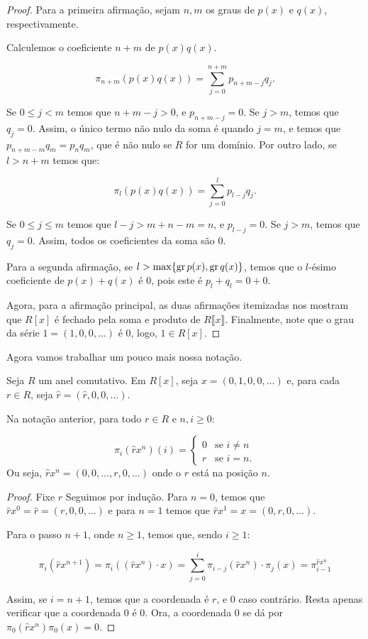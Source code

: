 \begin{proof}
    Para a primeira afirmação, sejam $n, m$ os graus de $p(x)$ e $q(x)$, respectivamente.
    
    Calculemos o coeficiente $n+m$ de $p(x)q(x)$. 

    $$\pi_{n+m}(p(x)q(x))=\sum_{j=0}^{n+m}p_{n+m-j}q_j.$$

    Se $0\leq j< m$ temos que $n+m-j>0$, e $p_{n+m-j}=0$. Se $j>m$, temos que $q_j=0$. Assim, o único termo não nulo da soma é quando $j=m$, e temos que $p_{n+m-m}q_m=p_nq_m$, que é não nulo se $R$ for um domínio. Por outro lado, se $l>n+m$ temos que:

    $$\pi_{l}(p(x)q(x))=\sum_{j=0}^{l}p_{l-j}q_j.$$

    Se $0\leq j\leq m$ temos que $l-j>m+n-m=n$, e $p_{l-j}=0$. Se $j>m$, temos que $q_j=0$. Assim, todos os coeficientes da soma são $0$.


    Para a segunda afirmação, se $l>\max\{\operatorname{gr} p(x), \operatorname{gr} q(x)\}$, temos que o $l$-ésimo coeficiente de $p(x)+q(x)$ é $0$, pois este é $p_l+q_l=0+0$.

    Agora, para a afirmação principal, as duas afirmações itemizadas nos mostram que $R[x]$ é fechado pela soma e produto de $R\llbracket x \rrbracket$. Finalmente, note que o grau da série $1=(1, 0, 0, \dots)$ é $0$, logo, $1\in R[x]$.
\end{proof}

Agora vamos trabalhar um pouco mais nossa notação.

\begin{definition}
    Seja $R$ um anel comutativo. Em $R[x]$, seja $x=(0, 1, 0, 0, \dots)$ e, para cada $r \in R$, seja $\hat r=(\hat r, 0, 0, \dots)$.
\end{definition}

\begin{lemma}
    Na notação anterior, para todo $r \in R$ e $n, i\geq 0$:

    $$\pi_i(\hat r x^n)(i)=\begin{cases}
        0 & \text{se } i\neq n\\
        r & \text{se } i=n.
    \end{cases}$$
    Ou seja, $\hat r x^n=(0, 0, \dots, r, 0, \dots)$ onde o $r$ está na posição $n$.
\end{lemma}

\begin{proof}
    Fixe $r$ Seguimos por indução. Para $n=0$, temos que $\hat rx^0=\hat r=(r, 0, 0, \dots)$ e para $n=1$ temos que $\hat r x^1=x=(0, r, 0, \dots)$.

    Para o passo $n+1$, onde $n\geq 1$, temos que, sendo $i\geq 1$:

    $$\pi_i(\hat rx^{n+1})=\pi_i((\hat rx^n)\cdot x)=\sum_{j=0}^i\pi_{i-j}(\hat r x^n)\cdot \pi_j(x)=\pi_{i-1}^{\hat r x^n}$$

    Assim, se $i=n+1$, temos que a coordenada é $r$, e $0$ caso contrário. Resta apenas verificar que a coordenada $0$ é $0$. Ora, a coordenada $0$ se dá por $\pi_0(\hat r x^n)\pi_0(x)=0$.
\end{proof}

